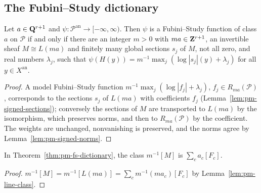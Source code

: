 \subsection{The Fubini--Study dictionary}

\begin{theorem}
\label{thm:pm-fs-dictionary}
\leanok
{}
Let $a\in\mathbf{Q}^{r+1}$ and $\psi\colon\mathcal P^{\mathrm{an}}\to[-\infty,\infty)$. Then $\psi$ is a
Fubini--Study function of class $a$ on $\mathcal P$ if and only if there are an integer $m>0$
with $ma\in\mathbf{Z}^{r+1}$, an invertible sheaf $M\cong L(ma)$ and finitely many global sections
$s_j$ of $M$, not all zero, and real numbers $\lambda_j$, such that
$\psi(H(y))=m^{-1}\max_j(\log|s_j|(y)+\lambda_j)$ for all $y\in X^{\mathrm{an}}$.
\end{theorem}
\begin{proof}
\leanok
A model Fubini--Study function $m^{-1}\max_j(\log|f_j|+\lambda_j)$, $f_j\in R_{ma}(\mathcal P)$,
corresponds to the sections $s_j$ of $L(ma)$ with coefficients $f_j$
(Lemma~\ref{lem:pm-signed-sections}); conversely the sections of $M$ are transported to
$L(ma)$ by the isomorphism, which preserves norms, and then to $R_{ma}(\mathcal P)$ by the
coefficient. The weights are unchanged, nonvanishing is preserved, and the norms agree by
Lemma~\ref{lem:pm-signed-norms}.
\end{proof}

\begin{lemma}
\label{lem:pm-fs-class}
\leanok
{}
In Theorem~\ref{thm:pm-fs-dictionary}, the class $m^{-1}[M]$ is $\sum_ca_c[F_c]$.
\end{lemma}
\begin{proof}
\leanok
$m^{-1}[M]=m^{-1}[L(ma)]=\sum_cm^{-1}(ma_c)[F_c]$ by Lemma~\ref{lem:pm-line-class}.
\end{proof}
